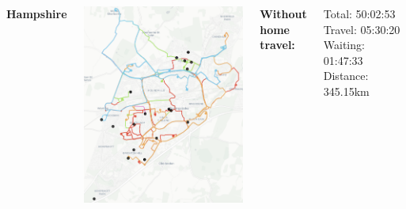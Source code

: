\documentclass[usenames,dvipsnames]{beamer}
\begin{document}
\begin{frame} 
	\begin{columns}
		\begin{minipage}[c][0.05\textheight][c]{\linewidth}
			\textbf{Hampshire}
		\end{minipage}
		\begin{minipage}[c][0.7\textheight][c]{\linewidth}
			\centering
			\includegraphics[width=0.9\linewidth]{figures/ogHampshire}
		\end{minipage}
		\begin{minipage}[c][0.2\textheight][c]{\linewidth}
			\scriptsize
			\hspace{17mm}\textbf{Without home travel:}
			\begin{itemize}
				\setlength{\itemindent}{0.5in}
				\setlength\itemsep{-0.2em}
				\aitem Total: 50:02:53
				\aitem Travel: 05:30:20
				\aitem Waiting: 01:47:33
				\aitem Distance: 345.15km
			\end{itemize}
		\end{minipage}
		\begin{minipage}[c][0.05\textheight][c]{\linewidth}

\end{minipage}
\end{columns}
\end{frame}
\end{document}
